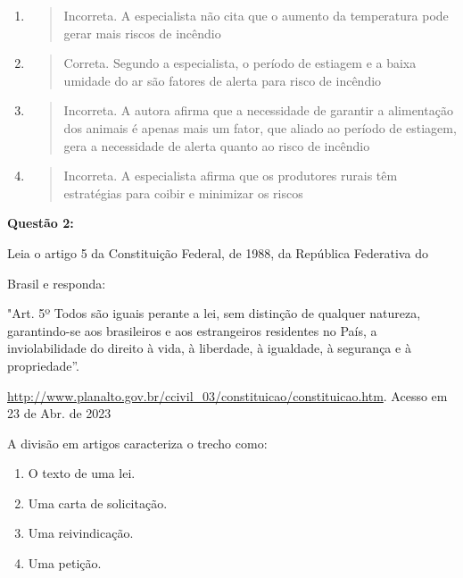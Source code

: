 \begin{enumerate}
\def\labelenumi{\alph{enumi})}
\item
  \begin{quote}
  Incorreta. A especialista não cita que o aumento da temperatura pode
  gerar mais riscos de incêndio
  \end{quote}
\item
  \begin{quote}
  Correta. Segundo a especialista, o período de estiagem e a baixa
  umidade do ar são fatores de alerta para risco de incêndio
  \end{quote}
\item
  \begin{quote}
  Incorreta. A autora afirma que a necessidade de garantir a alimentação
  dos animais é apenas mais um fator, que aliado ao período de estiagem,
  gera a necessidade de alerta quanto ao risco de incêndio
  \end{quote}
\item
  \begin{quote}
  Incorreta. A especialista afirma que os produtores rurais têm
  estratégias para coibir e minimizar os riscos
  \end{quote}
\end{enumerate}

\textbf{Questão 2:}

Leia o artigo 5 da Constituição Federal, de 1988, da República
Federativa do

Brasil e responda:

"Art. 5º Todos são iguais perante a lei, sem distinção de qualquer
natureza, garantindo-se aos brasileiros e aos estrangeiros residentes no
País, a inviolabilidade do direito à vida, à liberdade, à igualdade, à
segurança e à propriedade''.

\href{http://www.planalto.gov.br/ccivil_03/constituicao/constituicao.htm}{{http://www.planalto.gov.br/ccivil\_03/constituicao/constituicao.htm}}.
Acesso em 23 de Abr. de 2023

A divisão em artigos caracteriza o trecho como:

\begin{enumerate}
\def\labelenumi{\alph{enumi})}
\item
  O texto de uma lei.
\item
  Uma carta de solicitação.
\item
  Uma reivindicação.
\item
  Uma petição.
\end{enumerate}

